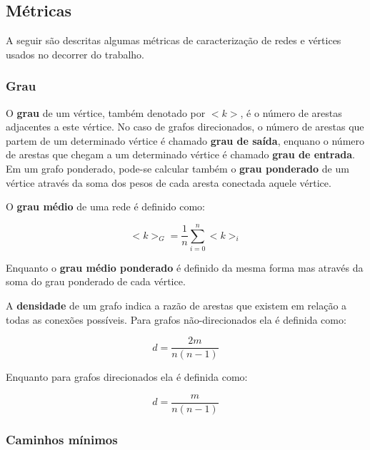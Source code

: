 \subsection{Métricas}
\label{section:metodologia:redes:metricas}

A seguir são descritas algumas métricas de caracterização de redes e vértices usados no decorrer do trabalho.

\subsubsection{Grau}
\label{section:metodologia:redes:metricas:grau}

O \textbf{grau} de um vértice, também denotado por $<k>$, é o número de arestas adjacentes a este vértice. No caso de grafos direcionados, o número de arestas que partem de um determinado vértice é chamado \textbf{grau de saída}, enquano o número de arestas que chegam a um determinado vértice é chamado \textbf{grau de entrada}. Em um grafo ponderado, pode-se calcular também o \textbf{grau ponderado} de um vértice através da soma dos pesos de cada aresta conectada aquele vértice.

O \textbf{grau médio} de uma rede é definido como:

\begin{equation}
    <k>_G = \frac{1}{n} \sum_{i=0}^{n} <k>_i
\end{equation}

Enquanto o \textbf{grau médio ponderado} é definido da mesma forma mas através da soma do grau ponderado de cada vértice.

A \textbf{densidade} de um grafo indica a razão de arestas que existem em relação a todas as conexões possíveis. Para grafos não-direcionados ela é definida como:

\begin{equation}
    d = \frac{2m}{n(n-1)}
\end{equation}

Enquanto para grafos direcionados ela é definida como:

\begin{equation}
    d = \frac{m}{n(n-1)}    
\end{equation}

\subsubsection{Caminhos mínimos}
\label{section:metodologia:redes:metricas:caminhos-minimos}


